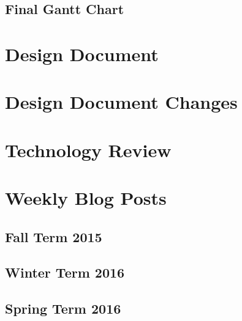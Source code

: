 \documentclass[letterpaper, onecolumn,10pt,draftclsnofoot]{IEEEtran}
\begin{document}
\subsection{Final Gantt Chart}

\section{Design Document}

\section{Design Document Changes}
  

\section{Technology Review}
\setlength{\fboxrule}{5pt}


	
\section{Weekly Blog Posts}

	\subsection{Fall Term 2015}
	
	\subsection{Winter Term 2016}
	
	\subsection{Spring Term 2016}

\newpage	
\end{document}
